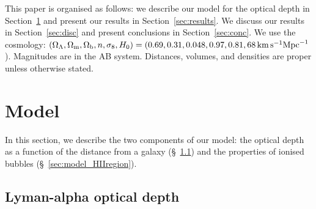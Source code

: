 \documentclass[fleqn,usenatbib]{mnras}
\begin{document}
This paper is organised as follows: we describe our model for the \lya optical depth in Section~\ref{sec:model} and present our results in Section~\ref{sec:results}. We discuss our results in Section~\ref{sec:disc} and present conclusions in Section~\ref{sec:conc}. We use the \citet{PlanckCollaboration2015} cosmology: $(\OL, \Om, \Ob, n,  \sigma_8, H_0) = (0.69, 0.31, 0.048, 0.97, 0.81, 68 \kms \mathrm{Mpc}^{-1}$). Magnitudes are in the AB system. Distances, volumes, and densities are proper unless otherwise stated.

\section{Model}
\label{sec:model}
In this section, we describe the two components of our model: the \lya optical depth as a function of the distance from a galaxy (\S~\ref{sec:model_optdepth}) and the properties of ionised bubbles (\S~\ref{sec:model_HIIregion}).

\subsection{Lyman-alpha optical depth}
\label{sec:model_optdepth}
\end{document}
